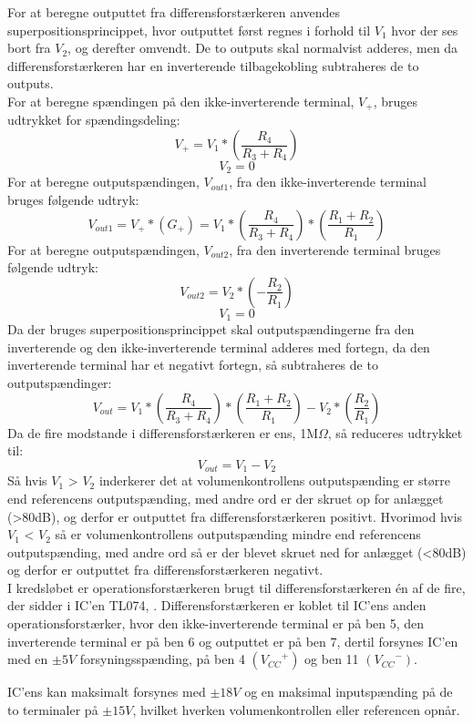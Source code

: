 %
For at beregne outputtet fra differensforstærkeren anvendes superpositionsprincippet, hvor outputtet først regnes i forhold til $V_1$ hvor der ses bort fra $V_2$, og derefter omvendt. De to outputs skal normalvist adderes, men da differensforstærkeren har en inverterende tilbagekobling subtraheres de to outputs.\\[5mm]
%
For at beregne spændingen på den ikke-inverterende terminal, $V_+$, bruges udtrykket for spændingsdeling:
%
\begin{equation}
	V_+ = V_1*\left(\frac{R_4}{R_3+R_4}\right)
\end{equation}
%
\begin{equation}
	V_2 = 0
\end{equation}
%
For at beregne outputspændingen, $V_{out1}$, fra den ikke-inverterende terminal bruges følgende udtryk:
%
\begin{equation}
	V_{out1} = V_+*(G_+)= V_1*\left(\frac{R_4}{R_3+R_4}\right)*\left(\frac{R_1+R_2}{R_1}\right)
\end{equation}
%
For at beregne outputspændingen, $V_{out2}$, fra den inverterende terminal bruges følgende udtryk:
%
\begin{equation}
	V_{out2} = V_2*\left(-\frac{R_2}{R_1}\right)
\end{equation}
%
\begin{equation}
	V_1 = 0
\end{equation}
%
Da der bruges superpositionsprincippet skal outputspændingerne fra den inverterende og den ikke-inverterende terminal adderes med fortegn, da den inverterende terminal har et negativt fortegn, så subtraheres de to outputspændinger: 
%
\begin{equation}
	V_{out} = V_1*\left(\frac{R_4}{R_3+R_4}\right)*\left(\frac{R_1+R_2}{R_1}\right)-V_2*\left(\frac{R_2}{R_1}\right)
\end{equation}
% 
Da de fire modstande i differensforstærkeren er ens, 1M$\Omega$, så reduceres udtrykket til:
%
\begin{equation}
	V_{out} = V_1-V_2
\end{equation}
%
Så hvis $V_1$ > $V_2$ inderkerer det at volumenkontrollens outputspænding er større end referencens outputspænding, med andre ord er der skruet op for anlægget (>80dB), og derfor er outputtet fra differensforstærkeren positivt. Hvorimod hvis $V_1$ < $V_2$ så er volumenkontrollens outputspænding mindre end referencens outputspænding, med andre ord så er der blevet skruet ned for anlægget (<80dB) og derfor er outputtet fra differensforstærkeren negativt.\\[5mm] 
%
I kredsløbet er operationsforstærkeren brugt til differensforstærkeren én af de fire, der sidder i IC'en TL074, \parencite{PDF:OpAmp}. Differensforstærkeren er koblet til IC'ens anden operationsforstærker, hvor den ikke-inverterende terminal er på ben 5, den inverterende terminal er på ben 6 og outputtet er på ben 7, dertil forsynes IC'en med en $\pm 5V$ forsyningsspænding, på ben 4 $({V_{CC}}^+)$ og ben 11 $({V_{CC}}^-)$. 

IC'ens kan maksimalt forsynes med $\pm 18V$ og en maksimal inputspænding på de to terminaler på $\pm 15V$, hvilket hverken volumenkontrollen eller referencen opnår.

